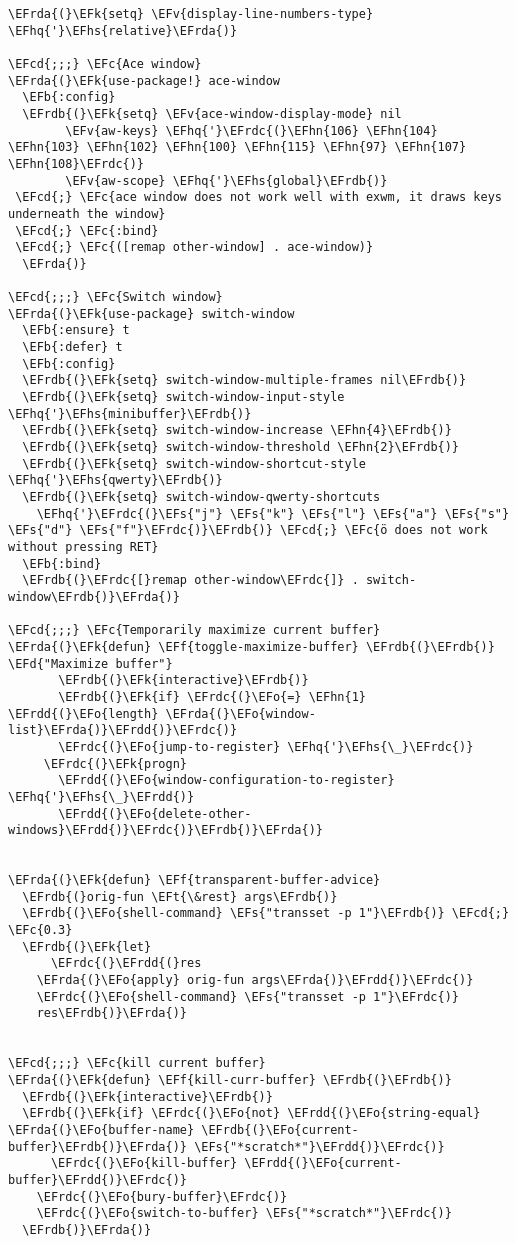 \documentclass[a4wide,10pt]{article}
\newcommand{\EFc}[1]{\textcolor{EFc}{#1}} %
\newcommand{\EFcd}[1]{\textcolor{EFcd}{#1}} %
\newcommand{\EFs}[1]{\textcolor{EFs}{#1}} %
\newcommand{\EFd}[1]{\textcolor{EFd}{#1}} %
\newcommand{\EFk}[1]{\textcolor{EFk}{#1}} %
\newcommand{\EFb}[1]{\textcolor{EFb}{#1}} %
\newcommand{\EFf}[1]{\textcolor{EFf}{#1}} %
\newcommand{\EFv}[1]{\textcolor{EFv}{#1}} %
\newcommand{\EFt}[1]{\textcolor{EFt}{#1}} %
\newcommand{\EFo}[1]{\textcolor{EFo}{#1}} %
\newcommand{\EFhn}[1]{\textcolor{EFhn}{\textbf{#1}}} %
\newcommand{\EFhq}[1]{\textcolor{EFhq}{#1}} %
\newcommand{\EFhs}[1]{\textcolor{EFhs}{#1}} %
\newcommand{\EFrda}[1]{\textcolor{EFrda}{#1}} %
\newcommand{\EFrdb}[1]{\textcolor{EFrdb}{#1}} %
\newcommand{\EFrdc}[1]{\textcolor{EFrdc}{#1}} %
\newcommand{\EFrdd}[1]{\textcolor{EFrdd}{#1}} %
\begin{document}
\begin{Code}
\begin{Verbatim}
\EFrda{(}\EFk{setq} \EFv{display-line-numbers-type} \EFhq{'}\EFhs{relative}\EFrda{)}

\EFcd{;;;} \EFc{Ace window}
\EFrda{(}\EFk{use-package!} ace-window
  \EFb{:config}
  \EFrdb{(}\EFk{setq} \EFv{ace-window-display-mode} nil
        \EFv{aw-keys} \EFhq{'}\EFrdc{(}\EFhn{106} \EFhn{104} \EFhn{103} \EFhn{102} \EFhn{100} \EFhn{115} \EFhn{97} \EFhn{107} \EFhn{108}\EFrdc{)}
        \EFv{aw-scope} \EFhq{'}\EFhs{global}\EFrdb{)}
 \EFcd{;} \EFc{ace window does not work well with exwm, it draws keys underneath the window}
 \EFcd{;} \EFc{:bind}
 \EFcd{;} \EFc{([remap other-window] . ace-window)}
  \EFrda{)}

\EFcd{;;;} \EFc{Switch window}
\EFrda{(}\EFk{use-package} switch-window
  \EFb{:ensure} t
  \EFb{:defer} t
  \EFb{:config}
  \EFrdb{(}\EFk{setq} switch-window-multiple-frames nil\EFrdb{)}
  \EFrdb{(}\EFk{setq} switch-window-input-style \EFhq{'}\EFhs{minibuffer}\EFrdb{)}
  \EFrdb{(}\EFk{setq} switch-window-increase \EFhn{4}\EFrdb{)}
  \EFrdb{(}\EFk{setq} switch-window-threshold \EFhn{2}\EFrdb{)}
  \EFrdb{(}\EFk{setq} switch-window-shortcut-style \EFhq{'}\EFhs{qwerty}\EFrdb{)}
  \EFrdb{(}\EFk{setq} switch-window-qwerty-shortcuts
	\EFhq{'}\EFrdc{(}\EFs{"j"} \EFs{"k"} \EFs{"l"} \EFs{"a"} \EFs{"s"} \EFs{"d"} \EFs{"f"}\EFrdc{)}\EFrdb{)} \EFcd{;} \EFc{ö does not work without pressing RET}
  \EFb{:bind}
  \EFrdb{(}\EFrdc{[}remap other-window\EFrdc{]} . switch-window\EFrdb{)}\EFrda{)}

\EFcd{;;;} \EFc{Temporarily maximize current buffer}
\EFrda{(}\EFk{defun} \EFf{toggle-maximize-buffer} \EFrdb{(}\EFrdb{)} \EFd{"Maximize buffer"}
       \EFrdb{(}\EFk{interactive}\EFrdb{)}
       \EFrdb{(}\EFk{if} \EFrdc{(}\EFo{=} \EFhn{1} \EFrdd{(}\EFo{length} \EFrda{(}\EFo{window-list}\EFrda{)}\EFrdd{)}\EFrdc{)}
	   \EFrdc{(}\EFo{jump-to-register} \EFhq{'}\EFhs{\_}\EFrdc{)}
	 \EFrdc{(}\EFk{progn}
	   \EFrdd{(}\EFo{window-configuration-to-register} \EFhq{'}\EFhs{\_}\EFrdd{)}
	   \EFrdd{(}\EFo{delete-other-windows}\EFrdd{)}\EFrdc{)}\EFrdb{)}\EFrda{)}


\EFrda{(}\EFk{defun} \EFf{transparent-buffer-advice}
  \EFrdb{(}orig-fun \EFt{\&rest} args\EFrdb{)}
  \EFrdb{(}\EFo{shell-command} \EFs{"transset -p 1"}\EFrdb{)} \EFcd{;} \EFc{0.3}
  \EFrdb{(}\EFk{let}
      \EFrdc{(}\EFrdd{(}res
	\EFrda{(}\EFo{apply} orig-fun args\EFrda{)}\EFrdd{)}\EFrdc{)}
    \EFrdc{(}\EFo{shell-command} \EFs{"transset -p 1"}\EFrdc{)}
    res\EFrdb{)}\EFrda{)}


\EFcd{;;;} \EFc{kill current buffer}
\EFrda{(}\EFk{defun} \EFf{kill-curr-buffer} \EFrdb{(}\EFrdb{)}
  \EFrdb{(}\EFk{interactive}\EFrdb{)}
  \EFrdb{(}\EFk{if} \EFrdc{(}\EFo{not} \EFrdd{(}\EFo{string-equal} \EFrda{(}\EFo{buffer-name} \EFrdb{(}\EFo{current-buffer}\EFrdb{)}\EFrda{)} \EFs{"*scratch*"}\EFrdd{)}\EFrdc{)}
      \EFrdc{(}\EFo{kill-buffer} \EFrdd{(}\EFo{current-buffer}\EFrdd{)}\EFrdc{)}
    \EFrdc{(}\EFo{bury-buffer}\EFrdc{)}
    \EFrdc{(}\EFo{switch-to-buffer} \EFs{"*scratch*"}\EFrdc{)}
  \EFrdb{)}\EFrda{)}


\end{Verbatim}
\end{Code}
\end{document}
